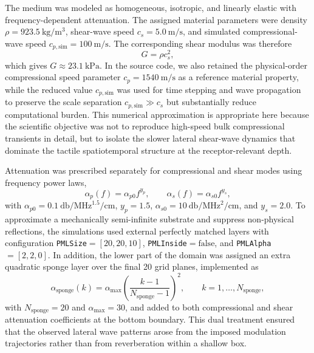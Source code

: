 \documentclass[pdflatex, sn-nature]{sn-jnl}
\theoremstyle{thmstyleone}%
\theoremstyle{thmstyletwo}%
\theoremstyle{thmstylethree}%
\begin{document}
The medium was modeled as homogeneous, isotropic, and linearly elastic with frequency-dependent attenuation. The assigned material parameters were density $\rho=\qty{923.5}{\kilo\gram\per\cubic\meter}$, shear-wave speed $c_s=\qty{5.0}{\meter\per\second}$, and simulated compressional-wave speed $c_{p,\mathrm{sim}}=\qty{100}{\meter\per\second}$. The corresponding shear modulus was therefore
\begin{equation}
    G = \rho c_s^2,
\end{equation}
which gives $G\approx \qty{23.1}{\kilo\pascal}$. In the source code, we also retained the physical-order compressional speed parameter $c_p=\qty{1540}{\meter\per\second}$ as a reference material property, while the reduced value $c_{p,\mathrm{sim}}$ was used for time stepping and wave propagation to preserve the scale separation $c_{p,\mathrm{sim}} \gg c_s$ but substantially reduce computational burden. This numerical approximation is appropriate here because the scientific objective was not to reproduce high-speed bulk compressional transients in detail, but to isolate the slower lateral shear-wave dynamics that dominate the tactile spatiotemporal structure at the receptor-relevant depth.

Attenuation was prescribed separately for compressional and shear modes using frequency power laws,
\begin{equation}
    \alpha_p(f) = \alpha_{p0} f^{y_p},
    \qquad
    \alpha_s(f) = \alpha_{s0} f^{y_s},
\end{equation}
with $\alpha_{p0}=\qty{0.1}{\decibel\per\mega\hertz\tothe{1.5}\per\centi\meter}$, $y_p=1.5$, $\alpha_{s0}=\qty{10}{\decibel\per\mega\hertz\squared\per\centi\meter}$, and $y_s=2.0$. To approximate a mechanically semi-infinite substrate and suppress non-physical reflections, the simulations used external perfectly matched layers with configuration \texttt{PMLSize}$=[20,20,10]$, \texttt{PMLInside}$=\mathrm{false}$, and \texttt{PMLAlpha}$=[2,2,0]$. In addition, the lower part of the domain was assigned an extra quadratic sponge layer over the final 20 grid planes, implemented as
\begin{equation}
    \alpha_{\mathrm{sponge}}(k)=\alpha_{\max}\left(\frac{k-1}{N_{\mathrm{sponge}}-1}\right)^2,
    \qquad k=1,\dots,N_{\mathrm{sponge}},
\end{equation}
with $N_{\mathrm{sponge}}=20$ and $\alpha_{\max}=30$, and added to both compressional and shear attenuation coefficients at the bottom boundary. This dual treatment ensured that the observed lateral wave patterns arose from the imposed modulation trajectories rather than from reverberation within a shallow box.
\end{document}
